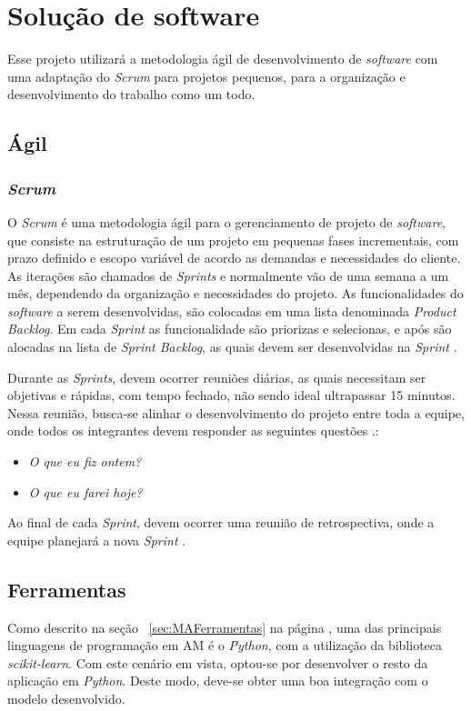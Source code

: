 \chapter[Solução de \textit{software}]{Solução de software}
Esse projeto utilizará a metodologia ágil de desenvolvimento de \textit{software} com uma adaptação do \textit{Scrum} para projetos pequenos, para a organização e desenvolvimento do trabalho como um todo.

\section{Ágil}
\subsection{\textit{Scrum}}
O \textit{Scrum} é uma metodologia ágil para o gerenciamento de projeto de \textit{software}, que consiste na estruturação de um projeto em pequenas fases incrementais, com prazo definido e escopo variável de acordo as demandas e necessidades do cliente. As iterações são chamados de \textit{Sprints} e normalmente vão de uma semana a um mês, dependendo da organização e necessidades do projeto. As funcionalidades do \textit{software} a serem desenvolvidas, são colocadas em uma lista denominada \textit{Product Backlog}. Em cada \textit{Sprint} as funcionalidade são priorizas e selecionas, e após são alocadas na lista de \textit{Sprint Backlog}, as quais devem ser desenvolvidas na \textit{Sprint} \cite{sutherland2016scrum}.

Durante as \textit{Sprints}, devem ocorrer reuniões diárias, as quais necessitam ser objetivas e rápidas, com tempo fechado, não sendo ideal ultrapassar 15 minutos. Nessa reunião, busca-se alinhar o desenvolvimento do projeto entre toda a equipe, onde todos os integrantes devem responder as seguintes questões \cite{sutherland2016scrum}.:
\begin{itemize}
    \item \textit{O que eu fiz ontem?}
    \item \textit{O que eu farei hoje?}
\end{itemize}

Ao final de cada \textit{Sprint}, devem ocorrer uma reunião de retrospectiva, onde a equipe planejará a nova \textit{Sprint} \cite{sutherland2016scrum}.

\section{Ferramentas}
Como descrito na seção ~\ref{sec:MAFerramentas} na página \pageref{sec:MAFerramentas}, uma das principais linguagens de programação em AM é o \textit{Python}, com a utilização da biblioteca \textit{scikit-learn}. Com este cenário em vista, optou-se por desenvolver o resto da aplicação em \textit{Python}. Deste modo, deve-se obter uma boa integração com o modelo desenvolvido.

